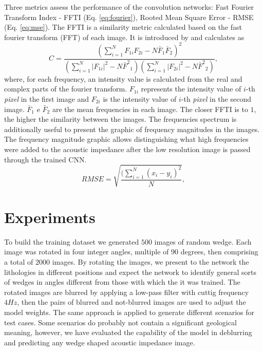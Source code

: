 \documentclass[conference,compsoc]{IEEEtran}
\begin{document}
Three metrics assess the performance of the convolution networks: Fast Fourier Transform Index - FFTI (Eq. \ref{eq:fourier}),
Rooted Mean Square Error - RMSE (Eq. \ref{eq:mse}). 
The FFTI is a similarity metric calculated based on the fast fourier transform (FFT) of each image.
It is introduced by \cite{naranyana} and calculates as 
\begin{equation}
 C = \frac{ (\sum_{i=1}^{N}{F_{1i}F_{2i}} - N \bar{F}_1\bar{F}_2 )^2 }{ (\sum_{i=1}^{N}{|F_{1i}|^2} - N{\bar{F}^2}_1)( \sum_{i=1}^{N}{|F_{2i}|^2} - N{\bar{F}^2}_2 )},
 \label{eq:fourier}
\end{equation}
where, for each frequency, an intensity value is calculated from the real and complex parts of the fourier
transform. $F_{1i}$ represents the intensity value of $i$-th \textit{pixel} in the first image and $F_{2i}$
is the intensity value of $i$-th \textit{pixel} in the second image. $\bar{F}_1$ e $\bar{F}_2$ are the mean
frequencies in each image. The closer FFTI is to $1$, the higher the similarity between the images.
The frequencies spectrum is additionally useful to present the graphic of frequency magnitudes in the images.
The frequency magnitude graphic allows distinguishing what high frequencies were added to the acoustic impedance
after the low resolution image is passed through the trained CNN. 
\begin{equation}
 RMSE = \sqrt{\frac{ (\sum_{i=1}^{N}{(x_i -y_i)^2 } }{N}},
 \label{eq:mse}
\end{equation}

\section{Experiments}
To build the training dataset we generated $500$ images of random wedge. Each image was rotated in four integer angles, multiple of $90$
degrees, then comprising a total of $2000$ images. 
By rotating the images, we present to the network the 
lithologies in different positions and expect the network
to identify general sorts of wedges in angles different from those with which the it was trained.
The rotated images are blurred by applying a low-pass filter with
cuttig frequency $4Hz$, then the pairs of blurred and not-blurred images are used to
adjust the model weights. The same approach is applied to generate different
scenarios for test cases. Some scenarios do probably not
contain a significant geological meaning, however, we have evaluated the capability of the model
in deblurring and predicting any wedge shaped acoustic impedance image.
\end{document}
